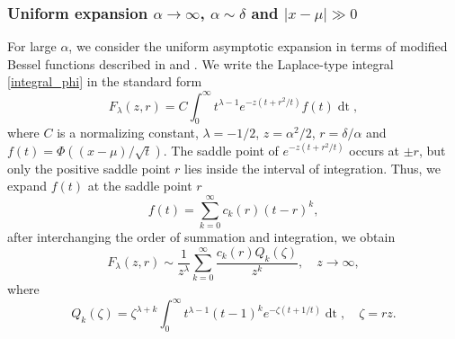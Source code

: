 \documentclass[10pt,a4paper,oneside]{article}
\numberwithin{equation}{section}
\begin{document}
\subsubsection{Uniform expansion $\alpha \to \infty$, $\alpha \sim \delta$ and $|x-\mu| \gg 0$}
For large $\alpha$, we consider the uniform asymptotic expansion in terms of modified Bessel functions described in \cite{Temme1990c} and \cite[\S 27]{Temme2015}. We write the Laplace-type integral \eqref{integral_phi} in the standard form
\begin{equation*}
F_{\lambda}(z, r) = C\int_0^{\infty} t^{\lambda - 1} e^{-z\left(t + r^2/t\right)} f(t) \mathop{dt},
\end{equation*}
where $C$ is a normalizing constant, $\lambda=-1/2$, $z = \alpha^2/2$, $r=\delta/\alpha$ and $f(t) = \Phi((x-\mu)/\sqrt{t})$. The saddle point of $e^{-z\left(t + r^2/t\right)}$ occurs at $\pm r$, but only the positive saddle point $r$ lies inside the interval of integration. Thus, we expand $f(t)$ at the saddle point $r$
\begin{equation*}
f(t) = \sum_{k=0}^{\infty} c_k(r)(t-r)^k,
\end{equation*}
after interchanging the order of summation and integration, we obtain 
\begin{equation}
F_{\lambda}(z, r) \sim \frac{1}{z^{\lambda}} \sum_{k=0}^{\infty} \frac{c_k(r) Q_k(\zeta)}{z^k}, \quad z \to \infty,
\end{equation}
where
\begin{equation*}
Q_k(\zeta) = \zeta^{\lambda + k}\int_0^{\infty} t^{\lambda - 1}(t-1)^k e^{-\zeta(t + 1/t)} \mathop{dt}, \quad \zeta = rz.
\end{equation*}
\end{document}

